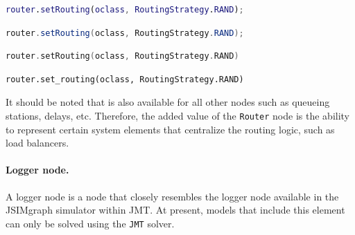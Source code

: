 \begin{MATLAB}
\begin{lstlisting}[language = matlab]
router.setRouting(oclass, RoutingStrategy.RAND);
\end{lstlisting}
\end{MATLAB}
\begin{JAVA}
\begin{lstlisting}[language = java, basicstyle=\ttfamily\scriptsize]
router.setRouting(oclass, RoutingStrategy.RAND);
\end{lstlisting}
\end{JAVA}
\begin{KOTLIN}
\begin{lstlisting}[language = kotlin, basicstyle=\ttfamily\scriptsize]
router.setRouting(oclass, RoutingStrategy.RAND)
\end{lstlisting}
\end{KOTLIN}
\begin{PYTHON}
\begin{lstlisting}[language = python]
router.set_routing(oclass, RoutingStrategy.RAND)
\end{lstlisting}
\end{PYTHON}
It should be noted that  is also available for all other nodes such as queueing stations, delays, etc. Therefore, the added value of the \texttt{Router} node is the ability to represent certain system elements that centralize the routing logic, such as load balancers.

\paragraph{Logger node.} A logger node is a node that closely resembles the logger node available in the JSIMgraph simulator within JMT. At present, models that include this element can only be solved using the \texttt{JMT} solver.

